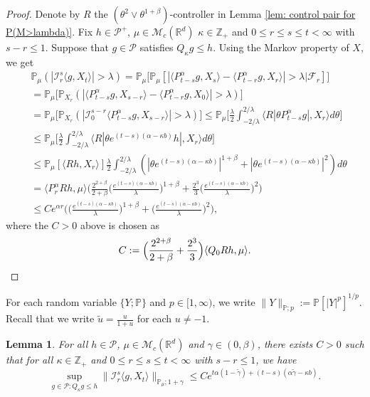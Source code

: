 \documentclass[12pt,a4paper]{amsart}
\theoremstyle{plain}
\newtheorem{lem}[thm]{Lemma}
\theoremstyle{definition}
\numberwithin{equation}{section}
\begin{document}
\begin{proof}
  Denote by $R$ the $(\theta^2\vee\theta^{1+\beta})$-controller in Lemma \ref{lem: control pair for P(M>lambda)}.
  Fix $h \in \mathcal P^+$, $\mu \in \mathcal M_c(\mathbb R^d)$ $\kappa \in \mathbb Z_+ $ and $0\leq r\leq s\leq t < \infty$ with $s-r \leq 1$.
  Suppose that $g\in \mathcal P$ satisfies $Q_\kappa g \leq h$.
  Using the Markov property of $X$, we get
  \begin{align}
    & \mathbb P_{\mu}(|\mathcal I_r^s\langle g, X_t\rangle|>\lambda)
      = \mathbb P_\mu \Big[\mathbb P_\mu [|\langle P_{t-s}^\alpha g, X_{s}\rangle - \langle P_{t-r}^\alpha g, X_{r}\rangle|> \lambda | \mathscr F_r ]\Big] \\
    & = \mathbb P_\mu \big[\mathbb P_{X_r}(|\langle P_{t-s}^\alpha g, X_{s-r}\rangle - \langle P_{t-r}^\alpha g, X_{0}\rangle|> \lambda)\big] \\
    & = \mathbb P_\mu \big[\mathbb P_{X_r}(|\mathcal I_0^{s-r}\langle P_{t-s}^\alpha g, X_{s-r}\rangle |> \lambda)\big]
      \leq \mathbb P_\mu \Big[ \frac{\lambda}{2}\int_{-2/\lambda}^{2/\lambda}\langle R|\theta P^\alpha_{t-s}g|,X_r\rangle d\theta \Big] \\
    & \leq \mathbb P_\mu \Big[ \frac{\lambda}{2}\int_{-2/\lambda}^{2/\lambda}\langle R|\theta e^{(t-s)(\alpha- \kappa b)}h|,X_r\rangle d\theta \Big] \\
    & \leq \mathbb P_\mu [ \langle Rh,X_r\rangle ] \frac{\lambda}{2}\int_{-2/\lambda}^{2/\lambda}(|\theta e^{(t-s)(\alpha- \kappa b)}|^{1+\beta} + |\theta e^{(t-s)(\alpha- \kappa b)}|^{2})d\theta
    \\ & =  \langle P_r^\alpha Rh,\mu\rangle \Big(  \frac{2^{2+\beta}}{2+\beta}\Big(\frac{e^{(t-s)(\alpha- \kappa b)}}{\lambda}\Big)^{1+\beta} + \frac{2^{3}}{3}\Big(\frac{e^{(t-s)(\alpha- \kappa b)}}{\lambda}\Big)^2\Big)
    \\ & \leq C e^{\alpha r} \Big(\Big( \frac{e^{(t-s)(\alpha - \kappa b)}}{\lambda}\Big)^{1+\beta} + \Big( \frac{e^{(t-s)(\alpha - \kappa b)}}{\lambda}\Big)^{2} \Big),
  \end{align}
  where the $C>0$ above is chosen as
  \[
    C 
    := \Big(\frac{2^{2+\beta}}{2+\beta} + \frac{2^{3}}{3} \Big)\langle Q_0Rh, \mu\rangle.
    \qedhere
  \]
\end{proof}

For each random variable $\{Y; \mathbb P\}$ and $p \in [1,\infty)$, we write $ \|Y\|_{\mathbb P;p} := \mathbb P[|Y|^p]^{1/p}$.
Recall that we write $\tilde u = \frac{u}{1+u}$ for each $u\neq -1$.
\begin{lem}
  \label{lem: control of mgtrs}
  For all $h \in \mathcal P$, $\mu \in \mathcal M_c(\mathbb R^d)$ and $\gamma\in (0, \beta)$, there exists $C > 0$ such that for all $\kappa \in \mathbb Z_+$ and $0\leq r \leq s\leq t<\infty$ with $s-r \leq 1$, we have
  \[
    \sup_{g \in \mathcal P: Q_\kappa g \leq h} \|\mathcal I_r^s\langle g, X_t\rangle \|_{\mathbb P_\mu;1+\gamma}
    \leq C e^{t\alpha (1- \tilde \gamma)+(t-s) (\alpha \tilde \gamma - \kappa b)}.
  \]
\end{lem}
\end{document}
